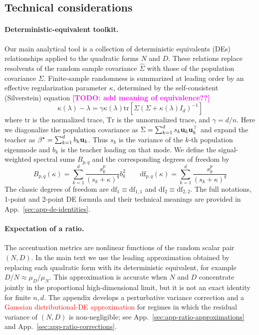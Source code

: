 \documentclass{article}
\newcommand{\red}[1]{\textcolor{red}{#1}}
\newcommand{\todo}[1]{\textcolor{magenta}{\textbf{[TODO: #1]}}}
\theoremstyle{plain}
\theoremstyle{definition}
\theoremstyle{remark}
\begin{document}
\subsection{Technical considerations}
\label{sec:technical-considerations}

\paragraph{Deterministic-equivalent toolkit.}
Our main analytical tool is a collection of deterministic equivalents (DEs) relationships applied to the quadratic forms $N$ and $D$. These relations replace resolvents of the random sample covariance $\hat\Sigma$ with those of the population covariance $\Sigma$. Finite-sample randomness is summarized at leading order by an effective regularization parameter $\kappa$, determined by the self-consistent (Silverstein) equation\cite{} \todo{add meaning of equivalence??}
\begin{equation}
    \kappa(\lambda)-\lambda=\gamma\kappa(\lambda)\mathrm{tr}[\Sigma(\Sigma+\kappa(\lambda)I_d)^{-1}]
    \label{eq:kappa-fixed-point}
\end{equation}
where $\mathrm{tr}$ is the normalized trace, $\mathrm{Tr}$ is the unnormalized trace, and $\gamma=d/n$.
Here we diagonalize the population covariance as $\Sigma=\sum_{k=1}^d s_k{\mathbf{u}}_k{\mathbf{u}}_k^\top$ and expand the teacher as ${\beta^{\star}}=\sum_{k=1}^d b_k{\mathbf{u}}_k$. Thus $s_k$ is the variance of the $k$-th population eigenmode and $b_k$ is the teacher loading on that mode. We define the signal-weighted spectral sums $B_{p,q}$ and the corresponding degrees of freedom by
\begin{equation}
B_{p,q}(\kappa)=\sum_{k=1}^{d}\frac{s_{k}^{p}}{(s_{k}+\kappa)^{q}}b_{k}^{2}\qquad
\mathrm{df}_{p,q}(\kappa)=\sum_{k=1}^{d}\frac{s_{k}^{p}}{(s_{k}+\kappa)^{q}}
\label{eq:spectral-summaries}
\end{equation}
The classic degrees of freedom are $\mathrm{df}_{1}\equiv\mathrm{df}_{1,1}$ and $\mathrm{df}_{2}\equiv\mathrm{df}_{2,2}$.
The full notations, 1-point and 2-point DE formula and their technical meanings are provided in App.~\ref{sec:app-de-identities}.

\paragraph{Expectation of a ratio.}
The accentuation metrics are nonlinear functions of the random scalar pair $(N,D)$. In the main text we use the leading approximation obtained by replacing each quadratic form with its deterministic equivalent, for example $D/N\approx\mu_D/\mu_N$. This approximation is accurate when $N$ and $D$ concentrate jointly in the proportional high-dimensional limit, but it is not an exact identity for finite $n,d$. The appendix develops a perturbative variance correction and a \red{Gaussian distributional-DE approximation} for regimes in which the residual variance of $(N,D)$ is non-negligible; see App.~\ref{sec:app-ratio-approximations} and App.~\ref{sec:app-ratio-corrections}.
\end{document}
